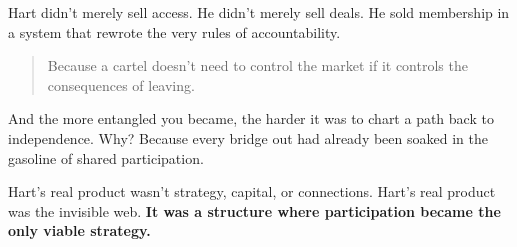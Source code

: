 \medskip

Hart didn’t merely sell access. He didn’t merely sell deals. He sold membership in a system that rewrote the very 
rules of accountability.

\begin{quote}
  Because a cartel doesn’t need to control the market if it controls the consequences of leaving.
\end{quote}

And the more entangled you became, the harder it was to chart a path back to independence. Why? Because every bridge out 
had already been soaked in the gasoline of shared participation.

Hart’s real product wasn’t strategy, capital, or connections.  
Hart’s real product was the invisible web.  
\textbf{It was a structure where participation became the only viable strategy.}

\medskip

